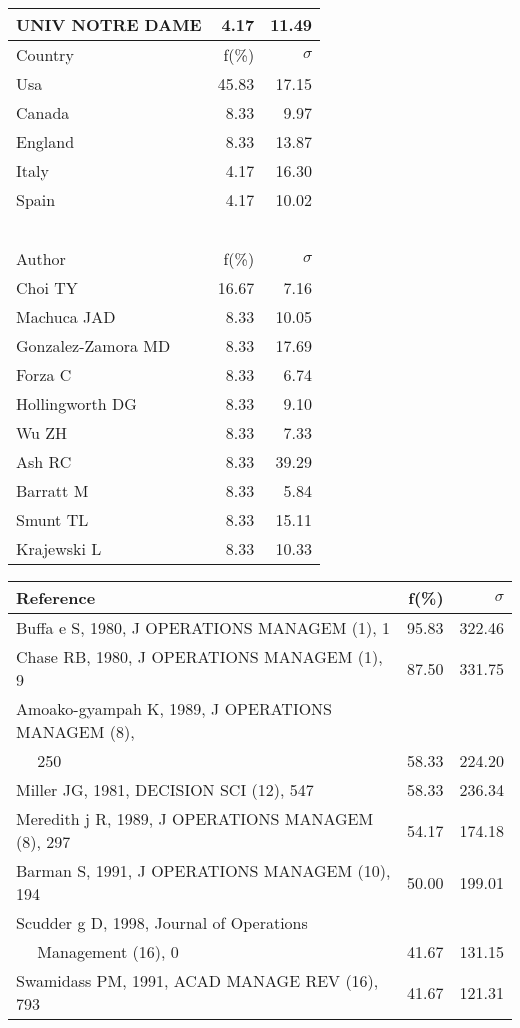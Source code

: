 \documentclass[a4paper,11pt]{report}
\begin{document}
\begin{landscape}
\begin{table}[!ht]
{\begin{tabular}{|l r r|}
UNIV NOTRE DAME & 4.17 & 11.49\\
\hline
\hline
Country & f(\%) & $\sigma$\\
\hline
Usa & 45.83 & 17.15\\
Canada & 8.33 & 9.97\\
England & 8.33 & 13.87\\
Italy & 4.17 & 16.30\\
Spain & 4.17 & 10.02\\
 &  & \\
 &  & \\
 &  & \\
 &  & \\
 &  & \\
\hline
\hline
Author & f(\%) & $\sigma$\\
\hline
Choi TY & 16.67 & 7.16\\
Machuca JAD & 8.33 & 10.05\\
Gonzalez-Zamora MD & 8.33 & 17.69\\
Forza C & 8.33 & 6.74\\
Hollingworth DG & 8.33 & 9.10\\
Wu ZH & 8.33 & 7.33\\
Ash RC & 8.33 & 39.29\\
Barratt M & 8.33 & 5.84\\
Smunt TL & 8.33 & 15.11\\
Krajewski L & 8.33 & 10.33\\
\hline
\end{tabular}
}
{\scriptsize\begin{tabular}{|l r r|}
\hline
Reference & f(\%) & $\sigma$\\
\hline
Buffa e S, 1980, J OPERATIONS MANAGEM (1), 1 & 95.83 & 322.46\\
Chase RB, 1980, J OPERATIONS MANAGEM (1), 9 & 87.50 & 331.75\\
Amoako-gyampah K, 1989, J OPERATIONS MANAGEM (8), &  & \\
$\quad$ 250 & 58.33 & 224.20\\
Miller JG, 1981, DECISION SCI (12), 547 & 58.33 & 236.34\\
Meredith j R, 1989, J OPERATIONS MANAGEM (8), 297 & 54.17 & 174.18\\
Barman S, 1991, J OPERATIONS MANAGEM (10), 194 & 50.00 & 199.01\\
Scudder g D, 1998, Journal of Operations &  & \\
$\quad$ Management (16), 0 & 41.67 & 131.15\\
Swamidass PM, 1991, ACAD MANAGE REV (16), 793 & 41.67 & 121.31\\

\end{tabular}}
\end{table}
\end{landscape}
\end{document}
